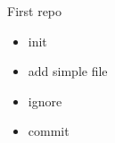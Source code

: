 \documentclass{beamer}
\begin{document}
\begin{frame}{First repo}
  \begin{itemize}
    \item init
    \item add simple file
    \item ignore
    \item commit
  \end{itemize}
\end{frame}
%
%
\end{document}
